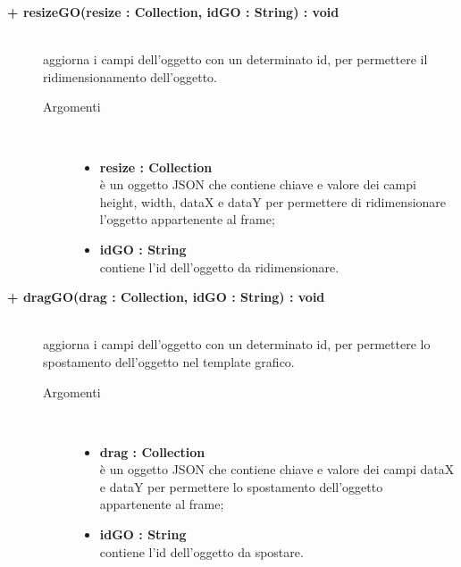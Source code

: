 \begin{description}
\begin{description}
\begin{description}
\end{description}

\end{description}

\begin{description}
		\item[\textbf{\color{blue}+ resizeGO(resize : Collection, idGO : String) : void			}] \hfill \\
			aggiorna i campi dell'oggetto con un determinato id, per permettere il ridimensionamento dell'oggetto.    

\begin{description}
			\item[Argomenti] \hfill \\
				\begin{itemize}
					\item \textbf{resize : Collection			} \hfill \\
					è un oggetto JSON che contiene chiave e valore dei campi height, width, dataX e dataY per permettere di ridimensionare l'oggetto appartenente al frame;
					\item \textbf{idGO : String			} \hfill \\
					contiene l'id dell'oggetto da ridimensionare.
				\end{itemize}

\end{description}

\end{description}

\begin{description}
		\item[\textbf{\color{blue}+ dragGO(drag : Collection, idGO : String) : void			}] \hfill \\
			aggiorna i campi dell'oggetto con un determinato id, per permettere lo spostamento dell'oggetto nel template grafico.    

\begin{description}
			\item[Argomenti] \hfill \\
				\begin{itemize}
					\item \textbf{drag : Collection			} \hfill \\
					è un oggetto JSON che contiene chiave e valore dei campi dataX e dataY per permettere lo spostamento dell'oggetto appartenente al frame;
					\item \textbf{idGO : String			} \hfill \\
					contiene l'id dell'oggetto da spostare.
				\end{itemize}


\end{description}
\end{description}
\end{description}
